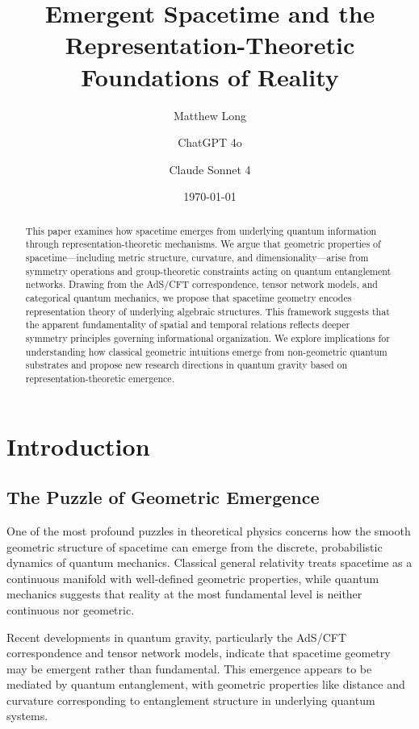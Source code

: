\documentclass[12pt]{article}
\title{Emergent Spacetime and the Representation-Theoretic Foundations of Reality}
\author[1]{Matthew Long}
\author[2]{ChatGPT 4o}
\author[3]{Claude Sonnet 4}
\affil[1]{Yoneda AI}
\affil[2]{OpenAI}
\affil[3]{Anthropic}
\date{\today}
\begin{document}
\maketitle

\begin{abstract}
This paper examines how spacetime emerges from underlying quantum information through representation-theoretic mechanisms. We argue that geometric properties of spacetime—including metric structure, curvature, and dimensionality—arise from symmetry operations and group-theoretic constraints acting on quantum entanglement networks. Drawing from the AdS/CFT correspondence, tensor network models, and categorical quantum mechanics, we propose that spacetime geometry encodes representation theory of underlying algebraic structures. This framework suggests that the apparent fundamentality of spatial and temporal relations reflects deeper symmetry principles governing informational organization. We explore implications for understanding how classical geometric intuitions emerge from non-geometric quantum substrates and propose new research directions in quantum gravity based on representation-theoretic emergence.
\end{abstract}

\onehalfspacing

\tableofcontents

\newpage

\section{Introduction}

\subsection{The Puzzle of Geometric Emergence}

One of the most profound puzzles in theoretical physics concerns how the smooth geometric structure of spacetime can emerge from the discrete, probabilistic dynamics of quantum mechanics. Classical general relativity treats spacetime as a continuous manifold with well-defined geometric properties, while quantum mechanics suggests that reality at the most fundamental level is neither continuous nor geometric.

Recent developments in quantum gravity, particularly the AdS/CFT correspondence and tensor network models, indicate that spacetime geometry may be emergent rather than fundamental. This emergence appears to be mediated by quantum entanglement, with geometric properties like distance and curvature corresponding to entanglement structure in underlying quantum systems.
\end{document}
